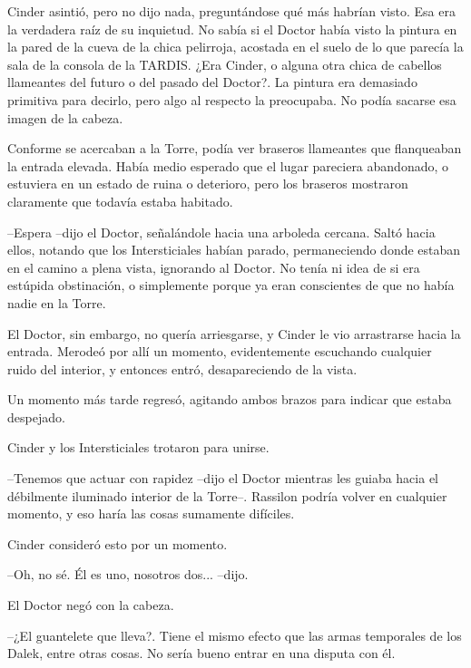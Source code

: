 Cinder asintió, pero no dijo nada, preguntándose qué más habrían visto. Esa era la verdadera raíz de su inquietud. No sabía si el Doctor había visto la pintura en la pared de la cueva de la chica pelirroja, acostada en el suelo de lo que parecía la sala de la consola de la TARDIS. ¿Era Cinder, o alguna otra chica de cabellos llameantes del futuro o del pasado del Doctor?. La pintura era demasiado primitiva para decirlo, pero algo al respecto la preocupaba. No podía sacarse esa imagen de la cabeza.

Conforme se acercaban a la Torre, podía ver braseros llameantes que flanqueaban la entrada elevada. Había medio esperado que el lugar pareciera abandonado, o estuviera en un estado de ruina o deterioro, pero los braseros mostraron claramente que todavía estaba habitado.

--Espera --dijo el Doctor, señalándole hacia una arboleda cercana. Saltó hacia ellos, notando que los Intersticiales habían parado, permaneciendo donde estaban en el camino a plena vista, ignorando al Doctor. No tenía ni idea de si era estúpida obstinación, o simplemente porque ya eran conscientes de que no había nadie en la Torre.



El Doctor, sin embargo, no quería arriesgarse, y Cinder le vio arrastrarse hacia la entrada. Merodeó por allí un momento, evidentemente escuchando cualquier ruido del interior, y entonces entró, desapareciendo de la vista.

Un momento más tarde regresó, agitando ambos brazos para indicar que estaba despejado.

Cinder y los Intersticiales trotaron para unirse.



--Tenemos que actuar con rapidez --dijo el Doctor mientras les guiaba hacia el débilmente iluminado interior de la Torre--. Rassilon podría volver en cualquier momento, y eso haría las cosas sumamente difíciles.



Cinder consideró esto por un momento. 



--Oh, no sé. Él es uno, nosotros dos... --dijo.



El Doctor negó con la cabeza. 



--¿El guantelete que lleva?. Tiene el mismo efecto que las armas temporales de los Dalek, entre otras cosas. No sería bueno entrar en una disputa con él.




